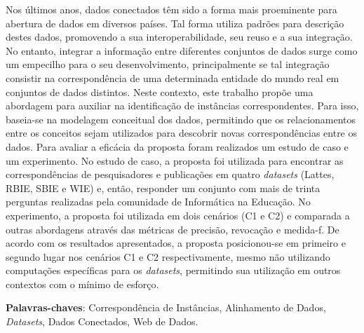 
\setlength{\absparsep}{18pt} %
\begin{resumo}
Nos últimos anos, dados conectados têm sido a forma mais proeminente para abertura de dados em diversos países. Tal forma utiliza padrões para descrição destes dados, promovendo a sua interoperabilidade, seu reuso e a sua integração. No entanto, integrar a informação entre diferentes conjuntos de dados surge como um empecilho para o seu desenvolvimento, principalmente se tal integração consistir na correspondência de uma determinada entidade do mundo real em conjuntos de dados distintos. Neste contexto, este trabalho propõe uma abordagem para auxiliar na identificação de instâncias correspondentes. Para isso, baseia-se na modelagem conceitual dos dados, permitindo que os relacionamentos entre os conceitos sejam utilizados para descobrir novas correspondências entre os dados. Para avaliar a eficácia da proposta foram realizados um estudo de caso e um experimento.  No estudo de caso, a proposta foi utilizada para encontrar as correspondências de pesquisadores e publicações em quatro \textit{datasets} (Lattes, RBIE, SBIE e WIE) e, então, responder um conjunto com mais de trinta perguntas realizadas pela comunidade de Informática na Educação. No experimento, a proposta foi utilizada em dois cenários (C1 e C2) e comparada a outras abordagens através das métricas de precisão, revocação e medida-f. De acordo com os resultados apresentados, a proposta posicionou-se em primeiro e segundo lugar nos cenários C1 e C2 respectivamente, mesmo não utilizando computações específicas para os \textit{datasets}, permitindo sua utilização em outros contextos com o mínimo de esforço.
% 
% 

 \textbf{Palavras-chaves}: Correspondência de Instâncias, Alinhamento de Dados, \textit{Datasets}, Dados Conectados, Web de Dados.
\end{resumo}

%
% 
